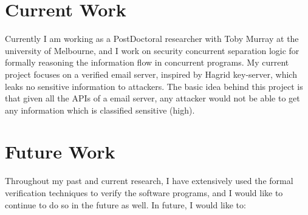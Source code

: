 \documentclass{article}
\begin{document}
\section{Current Work}
Currently I am working as a PostDoctoral researcher with Toby Murray at the university of Melbourne, and I work on 
security concurrent separation logic for formally reasoning the information flow in concurrent programs. My current project 
focuses on a verified email server,  inspired by Hagrid key-server, which leaks no sensitive information to attackers.
The basic idea behind this project is that given all the APIs of a email server, any attacker would not be able to get 
any information which is classified sensitive (high). 


\section{Future Work}
Throughout my past and current research, I have extensively used the formal verification techniques to verify the software programs, 
and I would like to continue to do so in the future as well. In future, I would like to:
\end{document}
